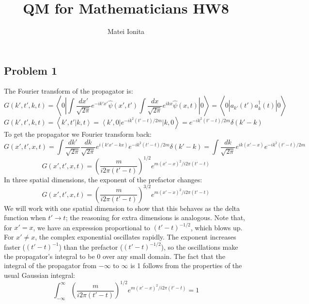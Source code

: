 \documentclass[12 pt]{article}
\title{QM for Mathematicians HW8}
\author{Matei Ionita}
\DeclareMathOperator {\lan} {\langle}
\DeclareMathOperator {\ran} {\rangle}
\begin{document}
  \maketitle


\subsection*{Problem 1}
The Fourier transform of the propagator is:
\[       G(k', t', k, t)  =  \lan 0 | \int \frac{dx'}{\sqrt{2\pi}}  e^{-ik'x'} \hat \psi(x', t')   \int \frac{dx}{\sqrt{2\pi}}  e^{ikx} \hat \psi (x,t) | 0 \ran   = \lan 0| a_{k'} (t') a_{k}^{\dagger} (t) |0\ran  \]
\[      G(k', t', k, t)  = \lan k', t' | k , t \ran   =  \lan k', 0 | e^{-i k^2  (t' - t)/2m} |k,0\ran    =   e^{-i k^2  (t' - t)/2m} \delta(k' - k)   \]
To get the propagator we Fourier transform back:
\[      G(x', t', x, t) =    \int \frac{dk'}{\sqrt{2\pi}} \frac{dk}{\sqrt{2\pi}}  e^{i(k'x'-kx)}   e^{-i k^2  (t' - t)/2m} \delta(k' - k)  = \int  \frac{dk}{\sqrt{2\pi}}  e^{ik(x'-x)}   e^{-i k^2  (t' - t)/2m}     \]
\[     G(x', t', x, t) =   \left(  \frac{m}{i2\pi (t'-t)} \right)^{1/2}  e^{m(x'-x)^2 / i2\pi (t'-t)}          \]
In three spatial dimensions, the exponent of the prefactor changes:
\[     G(x', t', x, t) =   \left(  \frac{m}{i2\pi (t'-t)} \right)^{3/2}  e^{m(x'-x)^2 / i2\pi (t'-t)}          \]
We will work with one spatial dimension to show that this behaves as the delta function when $t'\to t$; the reasoning for extra dimensions is analogous. Note that, for $x'=x$, we have an expression proportional to $(t'-t)^{-1/2}$, which blows up. For $x'\neq x$, the complex exponential oscillates rapidly. The exponent increases faster ($(t'-t)^{-1}$) than the prefactor ($(t'-t)^{-1/2}$), so the oscillations make the propagator's integral to be 0 over any small domain. The fact that the integral of the propagator from $-\infty$ to $\infty$ is 1 follows from the properties of the usual Gaussian integral:
\[        \int_{-\infty}^{\infty}  \left(  \frac{m}{i2\pi (t'-t)} \right)^{1/2}  e^{m(x'-x)^2 / i2\pi (t'-t)} = 1     \]
\end{document}
